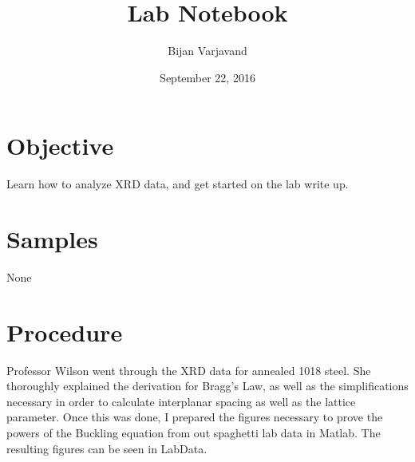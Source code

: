 \documentclass{article}
\author{Bijan Varjavand}
\title{Lab Notebook}
\date{September 22, 2016}
\begin{document}
\maketitle

\section{Objective}
Learn how to analyze XRD data, and get started on the lab write up.

\section{Samples}
None

\section{Procedure}
Professor Wilson went through the XRD data for annealed 1018 steel. She thoroughly explained the derivation for Bragg's Law, as well as the simplifications necessary in order to calculate interplanar spacing as well as the lattice parameter. Once this was done, I prepared the figures necessary to prove the powers of the Buckling equation from out spaghetti lab data in Matlab. The resulting figures can be seen in LabData.
\end{document}
